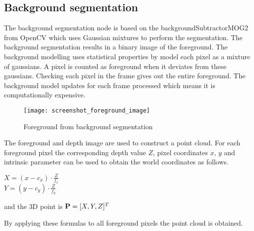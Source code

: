 
\subsection{Background segmentation}

The background segmentation node is based on the backgroundSubtractorMOG2 from OpenCV \cite{BGS} which uses Gaussian mixtures to perform the segmentation. The background segmentation results in a binary image of the foreground. The background modelling uses statistical properties by model each pixel as a mixture of gaussians. A pixel is counted as foreground when it deviates from these gaussians. Checking each pixel in the frame gives out the entire foreground. The background model updates for each frame processed which means it is computationally expensive. 

\begin{figure}[H]
\begin{center}
\texttt{[image: screenshot\_foreground\_image]}
\caption{Foreground from background segmentation}

\end{center}
\end{figure}


The foreground and depth image are used to construct a point cloud. For each foreground pixel the corresponding depth value $Z$, pixel coordinates $x$, $y$ and intrinsic parameter can be used to obtain the world coordinates as follows.

\begin{center}
$\displaystyle X = (x - c_x) \cdot \frac{Z}{f_x}$\\ \vspace{10 pt}
$\displaystyle Y = (y - c_y) \cdot \frac{Z}{f_y}$

and the 3D point is ${\bf P} = [X, Y, Z]^T$
\end{center}


By applying these formulas to all foreground pixels the point cloud is obtained.



